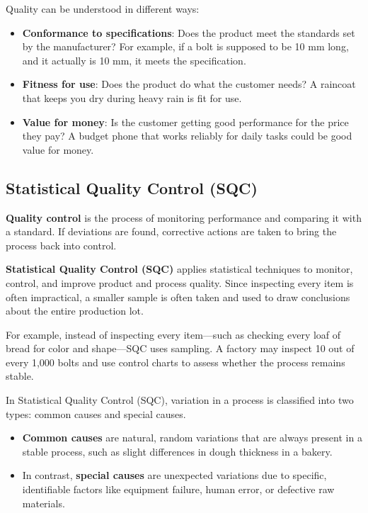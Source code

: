 \documentclass[twoside]{book}
\begin{document}
Quality can be understood in different ways:
\begin{itemize}
    \item \textbf{Conformance to specifications}: Does the product meet the standards set by the manufacturer? For example, if a bolt is supposed to be 10 mm long, and it actually is 10 mm, it meets the specification.
    \item \textbf{Fitness for use}: Does the product do what the customer needs? A raincoat that keeps you dry during heavy rain is fit for use.
    \item \textbf{Value for money}: Is the customer getting good performance for the price they pay? A budget phone that works reliably for daily tasks could be good value for money.
\end{itemize}

\subsection{Statistical Quality Control (SQC)}

\textbf{Quality control} is the process of monitoring performance and comparing it with a standard. If deviations are found, corrective actions are taken to bring the process back into control.

\textbf{Statistical Quality Control (SQC)} applies statistical techniques to monitor, control, and improve product and process quality. Since inspecting every item is often impractical, a smaller sample is often taken and used to draw conclusions about the entire production lot.

For example, instead of inspecting every item—such as checking every loaf of bread for color and shape—SQC uses sampling. A factory may inspect 10 out of every 1,000 bolts and use control charts to assess whether the process remains stable.

In Statistical Quality Control (SQC), variation in a process is classified into two types: common causes and special causes.

\begin{itemize}
\item \textbf{Common causes} are natural, random variations that are always present in a stable process, such as slight differences in dough thickness in a bakery.

\item In contrast,\textbf{ special causes} are unexpected variations due to specific, identifiable factors like equipment failure, human error, or defective raw materials.
\end{itemize}
\end{document}
